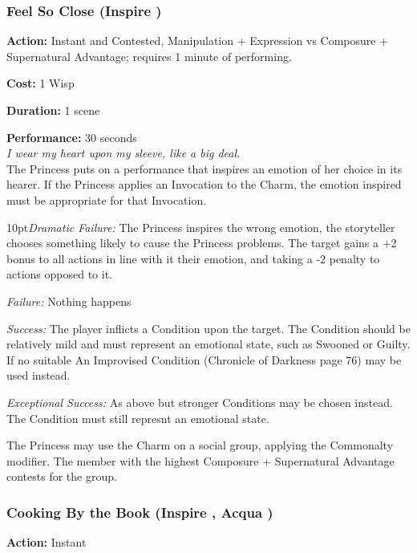 \subsubsection*{Feel So Close (Inspire \textbullet)}

\noindent \textbf{Action:} Instant and Contested, Manipulation + Expression vs Composure + Supernatural Advantage; requires 1 minute of performing. 

\noindent \textbf{Cost:} 1 Wisp

\noindent \textbf{Duration:} 1 scene

\noindent \textbf{Performance:} 30 seconds \\

\textit{I wear my heart upon my sleeve, like a big deal.} \\

\noindent The Princess puts on a performance that inspires an emotion of her choice in its hearer. If the Princess applies an Invocation to the Charm, the emotion inspired must be appropriate for that Invocation.

\begin{myindentpar}{10pt}\emph{Dramatic Failure:} The Princess inspires the wrong emotion, the storyteller chooses something likely to cause the Princess problems. The target gains a +2 bonus to all actions in line with it their emotion, and taking a -2 penalty to actions opposed to it.
 
 \emph{Failure:} Nothing happens
 
 \emph{Success:} The player inflicts a Condition upon the target. The Condition should be relatively mild and must represent an emotional state, such as Swooned or Guilty. If no suitable An Improvised Condition (Chronicle of Darkness page 76) may be used instead. 
 
 \emph{Exceptional Success:} As above but stronger Conditions may be chosen instead. The Condition must still represnt an emotional state. \end{myindentpar}

The Princess may use the Charm on a social group, applying the Commonalty modifier. The member with the highest Composure + Supernatural Advantage contests for the group.

\subsubsection*{Cooking By the Book (Inspire \textbullet, Acqua \textbullet)}

\noindent \textbf{Action:} Instant

